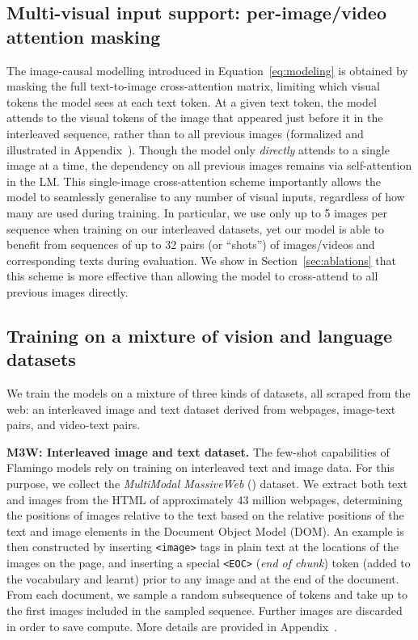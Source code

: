 \subsection{Multi-visual input support: per-image/video attention masking}
\label{sec:multi_im_att}


The image-causal modelling introduced in Equation~\eqref{eq:modeling} is obtained by masking the full text-to-image cross-attention matrix,
limiting which visual tokens the model sees at each text token.
At a given text token, the model attends to the visual tokens of the image that appeared just before it in the interleaved sequence, rather than to all previous images (formalized and illustrated in Appendix~).
Though the model only \textit{directly} attends to a single image at a time, the dependency on all previous images remains via self-attention in the LM.
This single-image cross-attention scheme importantly allows the model to seamlessly generalise to any number of visual inputs, regardless of how many are used during training.
In particular, we use only up to 5 images per sequence when training on our interleaved datasets, yet our model is able to benefit from sequences of up to 32 pairs (or ``shots'') of images/videos and corresponding texts during evaluation.
We show in Section~\ref{sec:ablations} that this scheme is more effective than allowing the model to cross-attend to all previous images directly.




\subsection{Training on a mixture of vision and language datasets}
\label{sec:datasets}\label{sec:training}


We train the \method{} models on a mixture of three kinds of datasets, all scraped from the web: an interleaved image and text dataset derived from webpages, image-text pairs, and video-text pairs. 


\textbf{M3W: Interleaved image and text dataset.}
\label{sec:interleaved_datasets}
The few-shot capabilities of Flamingo models rely on training on interleaved text and image data.
For this purpose, we collect the \emph{MultiModal MassiveWeb} (\mmmw) dataset.
We extract both text and images from the HTML of approximately 43 million webpages, determining the positions of images relative to the text based on the relative positions of the text and image elements in the Document Object Model (DOM).
An example is then constructed by inserting \texttt{<image>} tags in plain text at the locations of the images on the page, and inserting a special \texttt{<EOC>} (\textit{end of chunk}) token (added to the vocabulary and learnt) prior to any image and at the end of the document.
From each document, we sample a random subsequence of  tokens and take up to the first  images included in the sampled sequence.
Further images are discarded in order to save compute.
More details are provided in Appendix~.

